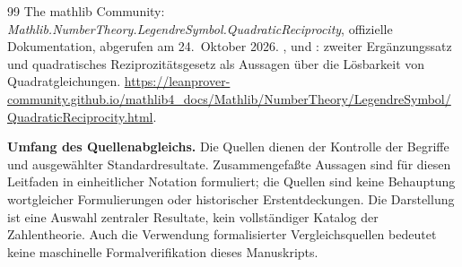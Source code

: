 \begin{thebibliography}{99}
The mathlib Community:
\emph{Mathlib.NumberTheory.LegendreSymbol.QuadraticReciprocity},
offizielle Dokumentation, abgerufen am 24.~Oktober 2026.
,
 und
:
zweiter Ergänzungssatz und quadratisches Reziprozitätsgesetz
als Aussagen über die Lösbarkeit von Quadratgleichungen.
\url{https://leanprover-community.github.io/mathlib4_docs/Mathlib/NumberTheory/LegendreSymbol/QuadraticReciprocity.html}.

\end{thebibliography}

\noindent\textbf{Umfang des Quellenabgleichs.}
Die Quellen dienen der Kontrolle der Begriffe und ausgewählter
Standardresultate. Zusammengefaßte Aussagen sind für diesen Leitfaden
in einheitlicher Notation formuliert; die Quellen sind keine
Behauptung wortgleicher Formulierungen oder historischer Erstentdeckungen.
Die Darstellung ist eine Auswahl zentraler Resultate, kein vollständiger
Katalog der Zahlentheorie. Auch die Verwendung formalisierter
Vergleichsquellen bedeutet keine maschinelle Formalverifikation
dieses Manuskripts.

